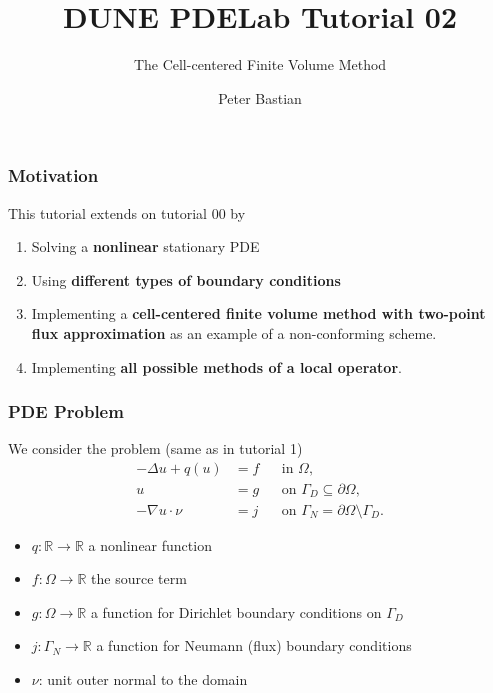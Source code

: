 \documentclass[aspectratio=169,11pt]{beamer}
\title{DUNE PDELab Tutorial 02}
\subtitle{The Cell-centered Finite Volume Method}
\author{Peter Bastian}
\institute[]
  {
  IWR\\
  Heidelberg University
}
\theoremstyle{definition}
\begin{document}


\begin{frame}
\frametitle{Motivation}
This tutorial extends on tutorial 00 by
\begin{enumerate}[1)]
\item Solving a \textbf{nonlinear} stationary PDE
\item Using \textbf{different types of boundary conditions}
\item Implementing a \textbf{cell-centered finite volume method with two-point flux
approximation} as an example of a non-conforming scheme.
\item Implementing \textbf{all possible methods of a local operator}.
\end{enumerate}
\end{frame}

\begin{frame}
\frametitle{PDE Problem}
We consider the problem (same as in tutorial 1)
\begin{align*}
-\Delta u + q(u) &= f &&\text{in $\Omega$},\\
u &= g &&\text{on $\Gamma_D\subseteq\partial\Omega$},\\
-\nabla u\cdot \nu &= j &&\text{on $\Gamma_N=\partial\Omega\setminus\Gamma_D$}.
\end{align*}
\begin{itemize}
\item $q:\mathbb{R}\to\mathbb{R}$ a nonlinear function
\item $f: \Omega\to\mathbb{R}$ the source term
\item $g: \Omega\to\mathbb{R}$ a function for Dirichlet boundary conditions on $\Gamma_D$
\item $j : \Gamma_N\to\mathbb{R}$ a function for Neumann (flux) boundary conditions
\item $\nu$: unit outer normal to the domain
\end{itemize}
\end{frame}
\end{document}
